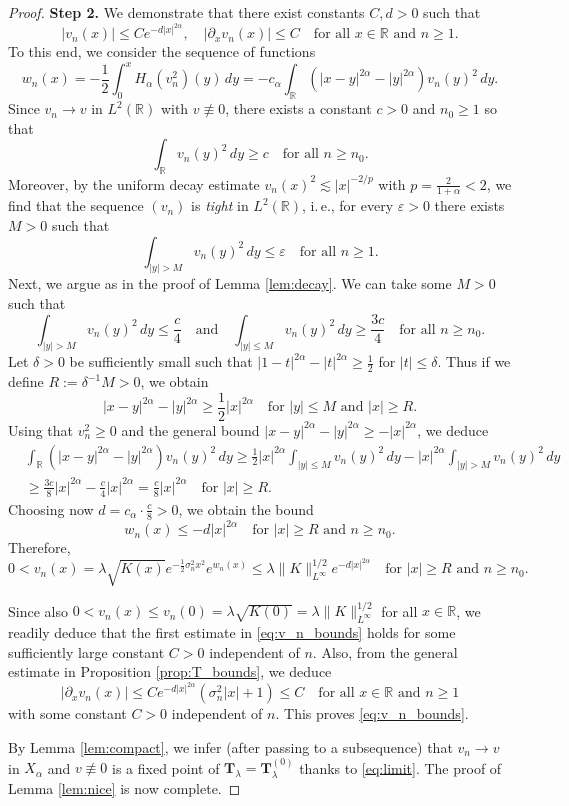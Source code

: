 \documentclass[reqno,10pt,a4paper]{amsart}
\theoremstyle{definition}
\theoremstyle{definition}
\theoremstyle{remark}
\theoremstyle{remark}
\numberwithin{equation}{section}
\newcommand{\R}{\mathbb{R}}
\newcommand{\pt}{\partial}
\newcommand{\be}{\begin{equation}}
\newcommand{\ee}{\end{equation}}
\newcommand{\eps}{\varepsilon}
\newcommand{\Ts}{\mathbf{T}}
\begin{document}
\begin{proof}
 \medskip
 \textbf{Step 2.} We demonstrate that there exist constants $C, d > 0$ such that
 \be \label{eq:v_n_bounds}
 |v_n(x)| \leq  C e^{-d |x|^{2 \alpha}}, \quad |\pt_x v_n(x)| \leq C \quad \mbox{for all $x \in \R$ and $n \geq 1$}.
 \ee
To this end, we consider the sequence of functions
$$
w_n(x) = -\frac{1}{2} \int_0^x H_\alpha(v_n^2)(y) \, dy = -c_\alpha \int_\R (|x-y|^{2 \alpha} - |y|^{2 \alpha}) v_n(y)^2 \, dy .
$$
Since $v_n \to v$ in $L^2(\R)$ with $v \not \equiv 0$, there exists a constant $c>0$ and $n_0 \geq 1$ so that
$$
\int_{\R} v_n(y)^2 \, dy \geq c \quad \mbox{for all $n \geq n_0$}.
$$
Moreover, by the uniform decay estimate $v_n(x)^2 \lesssim |x|^{-2/p}$ with $p=\frac{2}{1+\alpha} < 2$, we find that the sequence $(v_n)$ is {\em tight} in $L^2(\R)$, i.\,e., for every $\eps > 0$ there exists $M > 0$ such that
$$
\int_{|y| > M} v_n(y)^2 \, dy \leq \eps \quad \mbox{for all $n \geq 1$}.
$$ 
Next, we argue as in the proof of Lemma \ref{lem:decay}. We can take some $M>0$ such that
$$
\int_{|y| > M} v_n(y)^2 \, dy \leq \frac{c}{4} \quad \mbox{and} \quad \int_{|y| \leq M} v_n(y)^2 \, dy \geq \frac{3 c}{4} \quad \mbox{for all $n \geq n_0$}.
$$
Let $\delta > 0$ be sufficiently small such that $|1-t|^{2 \alpha} - |t|^{2 \alpha} \geq \frac{1}{2}$ for $|t| \leq \delta$. Thus if we define $R:=\delta^{-1} M > 0$, we obtain
$$
|x-y|^{2 \alpha} - |y|^{2 \alpha} \geq \frac{1}{2} |x|^{2 \alpha} \quad \mbox{for $|y| \leq M$ and $|x| \geq R$}.
$$
Using that $v_n^2 \geq 0$ and the general bound $|x-y|^{2\alpha} -|y|^{2 \alpha} \geq -|x|^{2 \alpha}$, we deduce
\begin{align*}
& \int_\R (|x-y|^{2 \alpha}- |y|^{2 \alpha}) v_n(y)^2 \, dy \geq \frac{1}{2} |x|^{2 \alpha} \int_{|y| \leq M} v_n(y)^2 \, dy - |x|^{2 \alpha} \int_{|y| > M} v_n(y)^2 \, dy \\
& \geq \frac{3 c}{8} |x|^{2 \alpha} - \frac{c}{4} |x|^{2 \alpha} = \frac{c}{8} |x|^{2 \alpha} \quad \mbox{for $|x| \geq R$}.
\end{align*}
Choosing now $d = c_\alpha \cdot \frac{c}{8} >0$, we obtain the bound
$$
w_n(x) \leq -d |x|^{2 \alpha} \quad \mbox{for $|x| \geq R$ and $n \geq n_0$}.
$$
Therefore,
$$
0 < v_n(x) = \lambda \sqrt{K(x)} e^{-\frac{1}{2} \sigma_n^2 x^2} e^{w_n(x)}  \leq \lambda \| K \|_{L^\infty}^{1/2}  e^{-d |x|^{2 \alpha}} \quad \mbox{for $|x| \geq R$ and $n \geq n_0$}.
$$

Since also $0 < v_n(x) \leq v_n(0) = \lambda \sqrt{K(0)} = \lambda \| K \|_{L^\infty}^{1/2}$ for all $x \in \R$, we readily deduce that the first estimate in \eqref{eq:v_n_bounds} holds for some sufficiently large constant $C>0$ independent of $n$. Also, from the general estimate in Proposition \ref{prop:T_bounds}, we deduce
$$
|\pt_x v_n(x)| \leq C e^{-d|x|^{2 \alpha}} (\sigma_n^2 |x| + 1) \leq C \quad \mbox{for all $x \in \R$ and $n \geq 1$}
$$
with some constant $C >0$ independent of $n$. This proves \eqref{eq:v_n_bounds}.

By Lemma \ref{lem:compact}, we infer (after passing to a subsequence) that $v_n \to v$ in $X_\alpha$ and $v \not \equiv 0$ is a fixed point of $\Ts_\lambda=\Ts_{\lambda}^{(0)}$ thanks to \eqref{eq:limit}. The proof of Lemma \ref{lem:nice} is now complete.
\end{proof}
\end{document}
